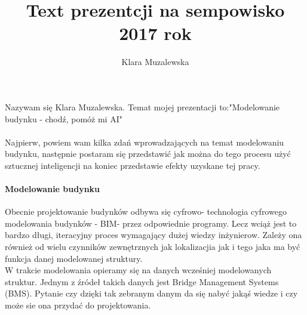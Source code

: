 \documentclass[11pt,a4paper]{article}
\author{Klara Muzalewska}
\title{Text prezentcji na sempowisko 2017 rok}
\begin{document}
\paragraph{}
Nazywam się Klara Muzalewska. Temat mojej prezentacji to:"Modelowanie budynku - chodź, pomóż mi AI"
\paragraph{}
Najpierw, powiem wam kilka zdań wprowadzających na temat modelowaniu budynku, następnie postaram się przedstawić jak można do tego procesu użyć sztucznej inteligencji na koniec przedstawie efekty uzyskane  tej pracy.
\paragraph{Modelowanie budynku}
Obecnie projektowanie budynków odbywa się cyfrowo- technologia cyfrowego modelowania budynków - BIM-  przez odpowiednie programy. Lecz wciąż jest to bardzo długi, iteracyjny proces wymagający dużej wiedzy inżynierow. Zależy ona również od wielu czynników zewnętrznych jak lokalizacjia jak i tego jaka ma być funkcja danej modelowanej struktury.\\
W trakcie modelowania opieramy się na danych wcześniej modelowanych struktur. Jednym z źródeł takich danych jest Bridge Management Systems (BMS). Pytanie czy dzięki tak zebranym danym da się nabyć jakąś wiedze i czy może sie ona przydać do projektowania.
\end{document}
